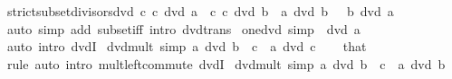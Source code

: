 \begin{isabellebody}
{\isafoldproof}%
%
\isadelimproof
\isanewline
%
\endisadelimproof
\isanewline
{}\isamarkupfalse%
\ strict{\isacharunderscore}{\kern0pt}subset{\isacharunderscore}{\kern0pt}divisors{\isacharunderscore}{\kern0pt}dvd{\isacharcolon}{\kern0pt}\ {\isachardoublequoteopen}{\isacharbraceleft}{\kern0pt}c{\isachardot}{\kern0pt}\ c\ dvd\ a{\isacharbraceright}{\kern0pt}\ {\isasymsubset}\ {\isacharbraceleft}{\kern0pt}c{\isachardot}{\kern0pt}\ c\ dvd\ b{\isacharbraceright}{\kern0pt}\ {\isasymlongleftrightarrow}\ a\ dvd\ b\ {\isasymand}\ {\isasymnot}\ b\ dvd\ a{\isachardoublequoteclose}\isanewline
%
\isadelimproof
\ \ %
\endisadelimproof
%
\isatagproof
{}\isamarkupfalse%
\ {\isacharparenleft}{\kern0pt}auto\ simp\ add{\isacharcolon}{\kern0pt}\ subset{\isacharunderscore}{\kern0pt}iff\ intro{\isacharcolon}{\kern0pt}\ dvd{\isacharunderscore}{\kern0pt}trans{\isacharparenright}{\kern0pt}%
\endisatagproof
{\isafoldproof}%
%
\isadelimproof
\isanewline
%
\endisadelimproof
\isanewline
{}\isamarkupfalse%
\ one{\isacharunderscore}{\kern0pt}dvd\ {\isacharbrackleft}{\kern0pt}simp{\isacharbrackright}{\kern0pt}{\isacharcolon}{\kern0pt}\ {\isachardoublequoteopen}{}\ dvd\ a{\isachardoublequoteclose}\isanewline
%
\isadelimproof
\ \ %
\endisadelimproof
%
\isatagproof
{}\isamarkupfalse%
\ {\isacharparenleft}{\kern0pt}auto\ intro{\isacharcolon}{\kern0pt}\ dvdI{\isacharparenright}{\kern0pt}%
\endisatagproof
{\isafoldproof}%
%
\isadelimproof
\isanewline
%
\endisadelimproof
\isanewline
{}\isamarkupfalse%
\ dvd{\isacharunderscore}{\kern0pt}mult\ {\isacharbrackleft}{\kern0pt}simp{\isacharbrackright}{\kern0pt}{\isacharcolon}{\kern0pt}\ {\isachardoublequoteopen}a\ dvd\ {\isacharparenleft}{\kern0pt}b\ {\isacharasterisk}{\kern0pt}\ c{\isacharparenright}{\kern0pt}{\isachardoublequoteclose}\ \ {\isachardoublequoteopen}a\ dvd\ c{\isachardoublequoteclose}\isanewline
%
\isadelimproof
\ \ %
\endisadelimproof
%
\isatagproof
{}\isamarkupfalse%
\ that\ \isamarkupfalse%
\ rule\ {\isacharparenleft}{\kern0pt}auto\ intro{\isacharcolon}{\kern0pt}\ mult{\isachardot}{\kern0pt}left{\isacharunderscore}{\kern0pt}commute\ dvdI{\isacharparenright}{\kern0pt}%
\endisatagproof
{\isafoldproof}%
%
\isadelimproof
\isanewline
%
\endisadelimproof
\isanewline
{}\isamarkupfalse%
\ dvd{\isacharunderscore}{\kern0pt}mult{}\ {\isacharbrackleft}{\kern0pt}simp{\isacharbrackright}{\kern0pt}{\isacharcolon}{\kern0pt}\ {\isachardoublequoteopen}a\ dvd\ {\isacharparenleft}{\kern0pt}b\ {\isacharasterisk}{\kern0pt}\ c{\isacharparenright}{\kern0pt}{\isachardoublequoteclose}\ \ {\isachardoublequoteopen}a\ dvd\ b{\isachardoublequoteclose}\isanewline

\end{isabellebody}
